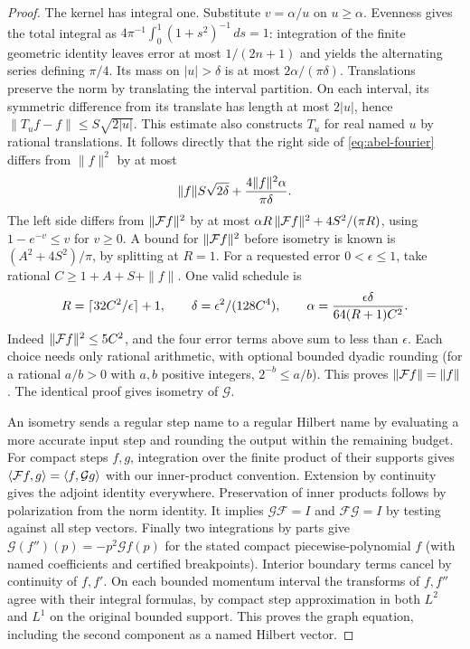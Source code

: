 \begin{proof}
The kernel has integral one. Substitute $v=\alpha/u$ on $u\ge\alpha$.
Evenness gives the total integral as
$4\pi^{-1}\int_0^1(1+s^2)^{-1}\,ds=1$: integration of the finite
geometric identity leaves error at most $1/(2n+1)$ and yields the
alternating series defining $\pi/4$. Its mass on $|u|>\delta$
is at most $2\alpha/(\pi\delta)$.
Translations preserve the norm by translating the interval partition.
On each interval, its symmetric difference from its translate has length
at most $2|u|$, hence
$\|T_u f-f\|\le S\sqrt{2|u|}$. This estimate also constructs $T_u$
for real named $u$ by rational translations. It follows directly that
the right side of \eqref{eq:abel-fourier} differs from $\|f\|^2$ by
at most
\[
 \|f\|S\sqrt{2\delta}+{4\|f\|^2\alpha\over\pi\delta}.
\]
The left side differs from $\|{\cal F}f\|^2$ by at most
$\alpha R\,\|{\cal F}f\|^2+4S^2/(\pi R)$, using
$1-e^{-v}\le v$ for $v\ge0$. A bound for $\|{\cal F}f\|^2$ before
isometry is known is $(A^2+4S^2)/\pi$, by splitting at $R=1$.
For a requested error $0<\epsilon\le1$, take rational
$C\ge1+A+S+\|f\|$. One valid schedule is
\[
 R=\lceil32 C^2/\epsilon\rceil+1,\qquad
 \delta=\epsilon^2/(128 C^4),\qquad
 \alpha={\epsilon\delta\over64(R+1)C^2}.
\]
Indeed $\|{\cal F}f\|^2\le 5C^2$, and the four error terms above
sum to less than $\epsilon$. Each choice needs only rational
arithmetic, with optional bounded dyadic rounding
(for a rational $a/b>0$ with $a,b$ positive integers, $2^{-b}\le a/b$).
This proves $\|{\cal F}f\|=\|f\|$. The identical proof gives isometry
of $\mathcal G$.

An isometry sends a regular step name to a regular Hilbert name by
evaluating a more accurate input step and rounding the output within
the remaining budget. For compact steps $f,g$, integration over the
finite product of their supports gives
$\langle{\cal F}f,g\rangle=\langle f,{\cal G}g\rangle$ with our
inner-product convention. Extension by continuity gives the adjoint
identity everywhere. Preservation of inner products follows by
polarization from the norm identity. It implies
$\mathcal G\mathcal F=I$ and $\mathcal F\mathcal G=I$ by testing against all
step vectors. Finally two integrations by parts give
$\mathcal G(f'')(p)=-p^2\mathcal G f(p)$ for the stated compact
piecewise-polynomial $f$ (with named coefficients and certified
breakpoints). Interior boundary terms cancel by continuity of $f,f'$.
On each bounded momentum interval the transforms of $f,f''$ agree
with their integral formulas, by compact step approximation in both
$L^2$ and $L^1$ on the original bounded support. This proves the graph
equation, including the second component as a named Hilbert vector.
\end{proof}

